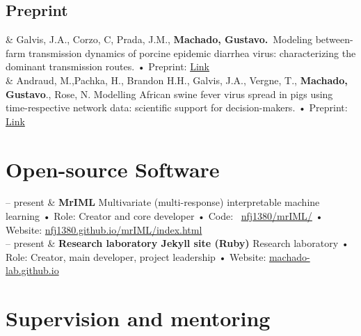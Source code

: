 \documentclass[11pt]{article}
\newcommand{\FirstName}{Gustavo}
\newcommand{\LastName}{Machado}
\newcommand{\Initials}{}
\newcommand{\Me}{\textbf{\LastName, \FirstName \Initials }}
\newcommand{\Preprint}[1]{\newline • Preprint: \faFilePdf}
\newcommand{\GitHub}[1]{\newline • Code: \faGithub\ \href{https://github.com/#1}{#1}}
\newcommand{\Role}[1]{\newline • Role: #1}
\newcommand{\Website}[1]{\newline • Website: \href{https://#1}{#1}}
\newcommand{\Duration}[2]{\fontsize{10pt}{0}\selectfont #1 -- #2}
\newcommand{\Year}[1]{\fontsize{10pt}{0}\selectfont #1}
\newcommand{\Ongoing}{present}
\begin{document}
\subsection{Preprint}
\begin{EntriesTable}


\Year{2022}  &
  Galvis, J.A., Corzo, C, Prada, J.M., {\textbf{Machado, Gustavo.}}\
  Modeling between-farm transmission dynamics of porcine epidemic diarrhea virus: characterizing the dominant transmission routes.
  \Preprint{}\href{Modeling between-farm transmission dynamics of porcine epidemic diarrhea virus: characterizing the dominant transmission routes}{Link}
  \\

  \Year{2021}  &
   Andraud, M.,Pachka, H., Brandon H.H., Galvis, J.A., Vergne, T., \Me., Rose, N.
  Modelling African swine fever virus spread in pigs using time-respective network data: scientific support for decision-makers. \Preprint{}\href{https://arxiv.org/abs/2111.13412}{Link}
    

\end{EntriesTable}

\nocite{*}
\printbibliography[title=PEER-REVIEWED]

\section{Open-source Software}

\begin{EntriesTable}
  \Duration{2021}{\Ongoing} &
  \textbf{MrIML}
  \newline
  Multivariate (multi-response) interpretable machine learning
  \Role{Creator and core developer}
  \GitHub{nfj1380/mrIML/}
  \Website{nfj1380.github.io/mrIML/index.html}
  \\
  \Duration{2020}{\Ongoing} &
  \textbf{Research laboratory Jekyll site (Ruby)}
  \newline
  Research laboratory
  \Role{Creator, main developer, project leadership}
  \Website{machado-lab.github.io}
\end{EntriesTable}


\section{Supervision and mentoring}
\end{document}

